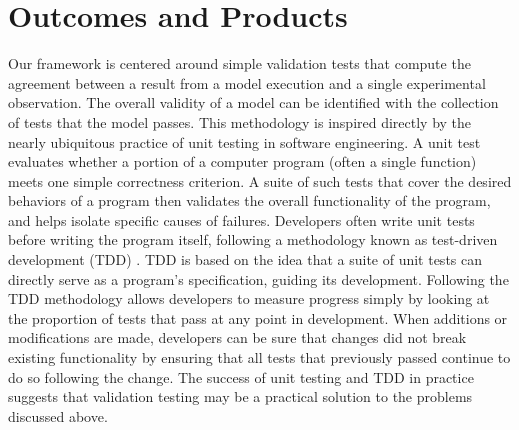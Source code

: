\documentclass[a4paper,12pt]{article}
\begin{document}

\section{Outcomes and Products}
Our framework is centered around simple validation tests that compute the agreement between a result from a model execution and a single experimental observation. The overall validity of a model can be identified with the collection of tests that the model passes. This methodology is inspired directly by the nearly ubiquitous practice of unit testing in software engineering. A unit test evaluates whether a portion of a computer program (often a single function) meets one simple correctness criterion. A suite of such tests that cover the desired behaviors of a program then validates the overall functionality of the program, and helps isolate specific causes of failures. Developers often write unit tests before writing the program itself, following a methodology known as test-driven development (TDD) \cite{beck2002}. TDD is based on the idea that a suite of unit tests can directly serve as a program's specification, guiding its development. Following the TDD methodology allows developers to measure progress simply by looking at the proportion of tests that pass at any point in development. When additions or modifications are made, developers can be sure that changes did not break existing functionality by ensuring that all tests that previously passed continue to do so following the change. The success of unit testing and TDD in practice suggests that validation testing may be a practical solution to the problems discussed above. 
\end{document}
